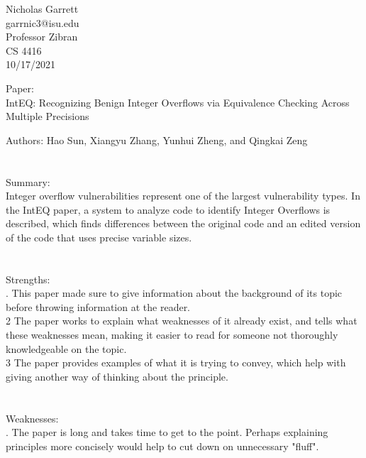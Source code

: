 \documentclass[12pt, a4paper]{article}
\begin{document}
\noindent
Nicholas Garrett\\
garrnic3@isu.edu\\ 
Professor Zibran \\
CS 4416\\
10/17/2021 \\


\begin{center}
\end{center}

\noindent
Paper:\\
	\indent
	IntEQ: Recognizing Benign Integer Overflows via Equivalence Checking Across Multiple Precisions

	Authors: Hao Sun, Xiangyu Zhang, Yunhui Zheng, and Qingkai Zeng\\ \\ \\
	
\noindent	
Summary:\\
	\indent
	Integer overflow vulnerabilities represent one of the largest vulnerability types.  In the IntEQ paper, a system to analyze code to identify Integer Overflows is described, which finds differences between the original code and an edited version of the code that uses precise variable sizes.  \\ \\ \\

\noindent
Strengths:\\
.  This paper made sure to give information about the background of its topic before throwing information at the reader. \\

	2  The paper works to explain what weaknesses of it already exist, and tells what these weaknesses mean, making it easier to read for someone not thoroughly knowledgeable on the topic.\\

	3 The paper provides examples of what it is trying to convey, which help with giving another way of thinking about the principle. \\ \\ \\

\noindent
Weaknesses: \\
. The paper is long and takes time to get to the point.  Perhaps explaining principles more concisely would help to cut down on unnecessary "fluff".  \\
\end{document}
